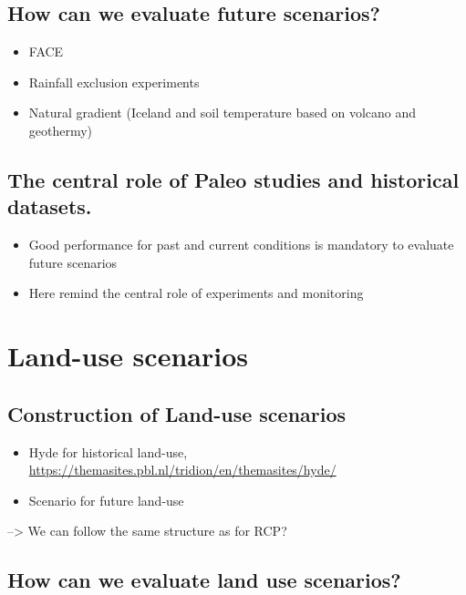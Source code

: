 \documentclass[12pt,oneside]{book}
\providecommand{\tightlist}{%
  \setlength{\itemsep}{0pt}\setlength{\parskip}{0pt}}
\begin{document}
\subsection{How can we evaluate future
scenarios?}\label{how-can-we-evaluate-future-scenarios}

\begin{itemize}
\tightlist
\item
  FACE
\item
  Rainfall exclusion experiments
\item
  Natural gradient (Iceland and soil temperature based on volcano and
  geothermy)
\end{itemize}

\subsection{The central role of Paleo studies and historical
datasets.}\label{the-central-role-of-paleo-studies-and-historical-datasets.}

\begin{itemize}
\tightlist
\item
  Good performance for past and current conditions is mandatory to
  evaluate future scenarios
\item
  Here remind the central role of experiments and monitoring
\end{itemize}

\section{Land-use scenarios}\label{land-use-scenarios}

\subsection{Construction of Land-use
scenarios}\label{construction-of-land-use-scenarios}

\begin{itemize}
\tightlist
\item
  Hyde for historical land-use,
  \url{https://themasites.pbl.nl/tridion/en/themasites/hyde/}
\item
  Scenario for future land-use
\end{itemize}

--\textgreater{} We can follow the same structure as for RCP?

\subsection{How can we evaluate land use
scenarios?}\label{how-can-we-evaluate-land-use-scenarios}
\end{document}
